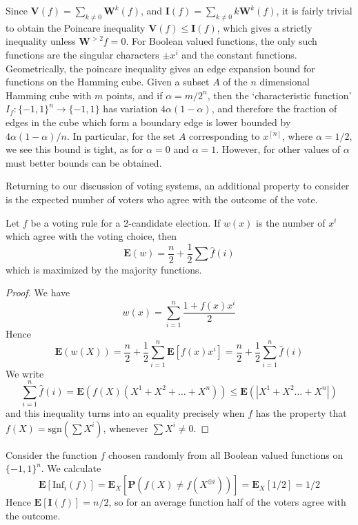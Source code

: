 Since $\mathbf{V}(f) = \sum_{k \neq 0} \mathbf{W}^k(f)$, and $\mathbf{I}(f) = \sum_{k \neq 0} k\mathbf{W}^k(f)$, it is fairly trivial to obtain the Poincare inequality $\mathbf{V}(f) \leq \mathbf{I}(f)$, which gives a strictly inequality unless $\mathbf{W}^{> 2}f = 0$. For Boolean valued functions, the only such functions are the singular characters $\pm x^i$ and the constant functions. Geometrically, the poincare inequality gives an edge expansion bound for functions on the Hamming cube. Given a subset $A$ of the $n$ dimensional Hamming cube with $m$ points, and if $\alpha = m/2^n$, then the `characteristic function' $I_f: \{ -1, 1 \}^n \to \{ -1, 1 \}$ has variation $4 \alpha (1 - \alpha)$, and therefore the fraction of edges in the cube which form a boundary edge is lower bounded by $4\alpha(1-\alpha)/n$. In particular, for the set $A$ corresponding to $x^{[n]}$, where $\alpha = 1/2$, we see this bound is tight, as for $\alpha = 0$ and $\alpha = 1$. However, for other values of $\alpha$ must better bounds can be obtained.

Returning to our discussion of voting systems, an additional property to consider is the expected number of voters who agree with the outcome of the vote.

\begin{theorem}
    Let $f$ be a voting rule for a 2-candidate election. If $w(x)$ is the number of $x^i$ which agree with the voting choice, then
    \[ \mathbf{E}(w) = \frac{n}{2} + \frac{1}{2} \sum \widehat{f}(i) \]
    which is maximized by the majority functions.
\end{theorem}
\begin{proof}
    We have
    \[ w(x) = \sum_{i = 1}^n \frac{1 + f(x) x^i}{2} \]
    Hence
    \[ \mathbf{E}(w(X)) = \frac{n}{2} + \frac{1}{2} \sum_{i = 1}^n \mathbf{E}[f(x)x^i] = \frac{n}{2} + \frac{1}{2} \sum_{i = 1}^n \widehat{f}(i) \]
    We write
    \[ \sum_{i = 1}^n \widehat{f}(i) = \mathbf{E}(f(X)(X^1 + X^2 + \dots + X^n)) \leq \mathbf{E}(|X^1 + X^2 \dots + X^n|) \]
    and this inequality turns into an equality precisely when $f$ has the property that $f(X) = \text{sgn}(\sum X^i)$, whenever $\sum X^i \neq 0$.
\end{proof}

\begin{example}
    Consider the function $f$ choosen randomly from all Boolean valued functions on $\{ -1, 1 \}^n$. We calculate
    \[ \mathbf{E}[\text{Inf}_i(f)] = \mathbf{E}_X[\mathbf{P}(f(X) \neq f(X^{\oplus i}))] = \mathbf{E}_X[1/2] = 1/2 \]
    Hence $\mathbf{E}[\mathbf{I}(f)] = n/2$, so for an average function half of the voters agree with the outcome.
\end{example}

